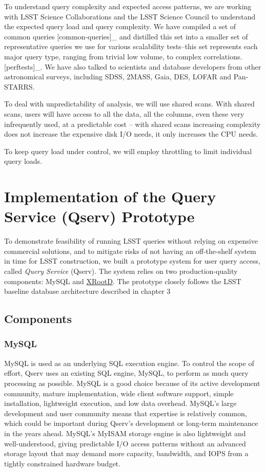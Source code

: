 \documentclass[DM,lsstdraft,toc]{lsstdoc}
\begin{document}
To understand query complexity and expected access patterns, we are
working with LSST Science Collaborations and the LSST Science Council to
understand the expected query load and query complexity. We have
compiled a set of common queries {[}common-queries{]}\_ and distilled
this set into a smaller set of representative queries we use for various
scalability tests--this set represents each major query type, ranging
from trivial low volume, to complex correlations. {[}perftests{]}\_. We
have also talked to scientists and database developers from other
astronomical surveys, including SDSS, 2MASS, Gaia, DES, LOFAR and
Pan-STARRS.

To deal with unpredictability of analysis, we will use shared scans.
With shared scans, users will have access to all the data, all the
columns, even these very infrequently used, at a predictable cost --
with shared scans increasing complexity does not increase the expensive
disk I/O needs, it only increases the CPU needs.

To keep query load under control, we will employ throttling to limit
individual query loads.

\section{Implementation of the Query Service (Qserv)
Prototype}\label{implementation}

To demonstrate feasibility of running LSST queries without relying on
expensive commercial solutions, and to mitigate risks of not having an
off-the-shelf system in time for LSST construction, we built a prototype
system for user query access, called \emph{Query Service} (Qserv). The
system relies on two production-quality components: MySQL and
\href{http://xrootd.org}{XRootD}. The prototype closely follows the LSST
baseline database architecture described in chapter 3

\subsection{Components}\label{components}

\subsubsection{MySQL}\label{mysql}

MySQL is used as an underlying SQL execution engine. To control the
scope of effort, Qserv uses an existing SQL engine, MySQL, to perform as
much query processing as possible. MySQL is a good choice because of its
active development community, mature implementation, wide client
software support, simple installation, lightweight execution, and low
data overhead. MySQL's large development and user community means that
expertise is relatively common, which could be important during Qserv's
development or long-term maintenance in the years ahead. MySQL's MyISAM
storage engine is also lightweight and well-understood, giving
predictable I/O access patterns without an advanced storage layout that
may demand more capacity, bandwidth, and IOPS from a tightly constrained
hardware budget.
\end{document}
